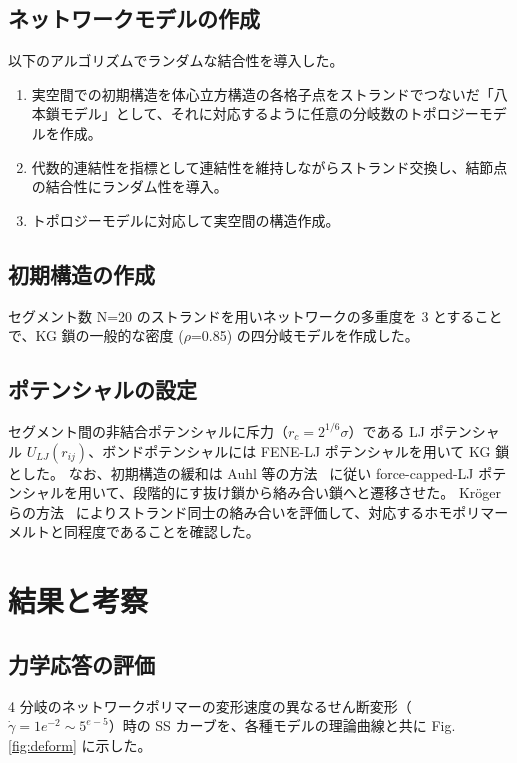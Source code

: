 \documentclass[uplatex,10pt,a4paper,twocolumn]{jsarticle}
\begin{document}
\subsection{ネットワークモデルの作成}

以下のアルゴリズムでランダムな結合性を導入した。

\begin{enumerate}
\item
実空間での初期構造を体心立方構造の各格子点をストランドでつないだ「八本鎖モデル」として、それに対応するように任意の分岐数のトポロジーモデルを作成。
\item
代数的連結性を指標として連結性を維持しながらストランド交換し、結節点の結合性にランダム性を導入。
\item
トポロジーモデルに対応して実空間の構造作成。
\end{enumerate}

\subsection{初期構造の作成}
セグメント数 N=20 のストランドを用いネットワークの多重度を 3 とすることで、KG 鎖の一般的な密度 ($\rho$=0.85) の四分岐モデルを作成した。

\subsection{ポテンシャルの設定}
セグメント間の非結合ポテンシャルに斥力（$r_c = 2^{1/6}\sigma$）である LJ ポテンシャル $U_{LJ}(r_{ij})$、ボンドポテンシャルには FENE-LJ ポテンシャルを用いて KG 鎖とした。
なお、初期構造の緩和は Auhl 等の方法~\cite{Auhl} に従い force-capped-LJ ポテンシャルを用いて、段階的にす抜け鎖から絡み合い鎖へと遷移させた。
Kr\"{o}ger らの方法~\cite{Kroger} によりストランド同士の絡み合いを評価して、対応するホモポリマーメルトと同程度であることを確認した。


\section{結果と考察}

\subsection{力学応答の評価}
4 分岐のネットワークポリマーの変形速度の異なるせん断変形（$\dot{\gamma} = 1e^{-2} \sim 5^{e-5}$）時の SS カーブを、各種モデルの理論曲線と共に Fig. \ref{fig:deform} に示した。
\newpage
\end{document}
